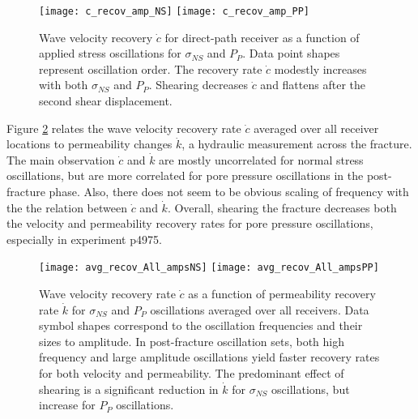 \documentclass[draft]{agujournal2019}
\begin{document}
\clearpage

\begin{figure}[ht]
	\centering
	\texttt{[image: c\_recov\_amp\_NS]}
	\texttt{[image: c\_recov\_amp\_PP]}
	\caption{Wave velocity recovery $ \dot c $ for direct-path receiver as a function of applied stress oscillations for $ \sigma_{NS} $ and $ P_P $. Data point shapes represent oscillation order. The recovery rate $ \dot c $ modestly increases with both $ \sigma_{NS} $ and $ P_P $. Shearing decreases $ \dot c $ and flattens after the second shear displacement. }
	\label{fig:c_recov}
\end{figure}

\clearpage


Figure \ref{fig:avg_recov_plots} relates the wave velocity recovery rate $ \dot c $ averaged over all receiver locations to permeability changes $ \dot k $, a hydraulic measurement across the fracture. The main observation $ \dot c $ and $ \dot k $ are mostly uncorrelated for normal stress oscillations, but are more correlated for pore pressure oscillations in the post-fracture phase. Also, there does not seem to be obvious scaling of frequency with the the relation between 
$ \dot c $ and $ \dot k $. Overall, shearing the fracture decreases both the velocity and permeability recovery rates for pore pressure oscillations, especially in experiment p4975. 

\clearpage

\begin{figure}[ht]
	\centering
	\texttt{[image: avg\_recov\_All\_ampsNS]}
	\texttt{[image: avg\_recov\_All\_ampsPP]}
	\caption{Wave velocity recovery rate $ \dot c $ as a function of permeability recovery rate $ \dot k$ for $ \sigma_{NS} $ and $ P_P $ oscillations averaged over all receivers. Data symbol shapes correspond to the oscillation frequencies and their sizes to amplitude. In post-fracture oscillation sets, both high frequency and large amplitude oscillations yield faster recovery rates for both velocity and permeability. The predominant effect of shearing is a significant reduction in $ \dot k $ for $ \sigma_{NS} $ oscillations, but increase for  $ P_P $ oscillations.}
	\label{fig:avg_recov_plots}
\end{figure}

\clearpage

\end{document}
